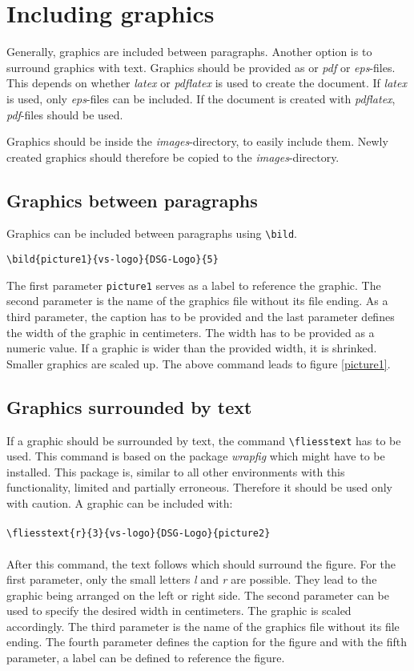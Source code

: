 %
\section{Including graphics}
%
Generally, graphics are included between paragraphs.
Another option is to surround graphics with text.
Graphics should be provided as or \emph{pdf} or \emph{eps}-files.
This depends on whether \emph{latex} or \emph{pdflatex} is used to create the document.
If \emph{latex} is used, only \emph{eps}-files can be included.
If the document is created with \emph{pdflatex}, \emph{pdf}-files should be used.

Graphics should be inside the \emph{images}-directory, to easily include them. 
Newly created graphics should therefore be copied to the \emph{images}-directory.

\subsection{Graphics between paragraphs}
%
Graphics can be included between paragraphs using 
\texttt{\textbackslash bild}.
\begin{verbatim}
\bild{picture1}{vs-logo}{DSG-Logo}{5}
\end{verbatim}
The first parameter \texttt{picture1} serves as a label to reference the graphic. 
The second parameter is the name of the graphics file without its file ending.
As a third parameter, the caption has to be provided and the last parameter defines the width of the graphic in centimeters. 
The width has to be provided as a numeric value. 
If a graphic is wider than the provided width, it is shrinked.
Smaller graphics are scaled up.
The above command leads to figure \ref{picture1}.


\subsection{Graphics surrounded by text}
%
If a graphic should be surrounded by text, the command \texttt{\textbackslash fliesstext} has to be used.
This command is based on the package \emph{wrapfig} which might have to be installed.
This package is, similar to all other environments with this functionality, limited and partially erroneous.
Therefore it should be used only with caution.
A graphic can be included with:\\\\
\verb+\fliesstext{r}{3}{vs-logo}{DSG-Logo}{picture2}+\\\\
After this command, the text follows which should surround the figure.
For the first parameter, only the small letters \emph{l} and \emph{r} are possible.
They lead to the graphic being arranged on the left or right side.
The second parameter can be used to specify the desired width in centimeters.
The graphic is scaled accordingly.
The third parameter is the name of the graphics file without its file ending.
The fourth parameter defines the caption for the figure and with the fifth parameter, a label can be defined to reference the figure.

